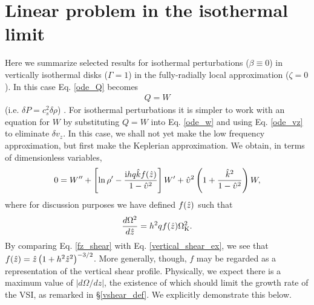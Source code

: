 \section{Linear problem in the isothermal limit}\label{iso_discuss}  
Here we summarize selected results for isothermal
perturbations ($\beta\equiv 0$) in vertically isothermal disks 
($\Gamma=1$) in the fully-radially local approximation
($\zeta=0$). In this case Eq. \ref{ode_Q}
becomes    
\begin{align} 
  Q = W 
\end{align}
(i.e. $\delta P = c_s^2\delta \rho$)%
. For isothermal perturbations it is 
simpler to work with an equation for $W$ by substituting $Q=W$ into
Eq. \ref{ode_w} and using Eq. \ref{ode_vz} to eliminate $\delta v_z$. 
In this case, we shall not yet make the low frequency
approximation, but first make the  Keplerian approximation. We
obtain, in terms of dimensionless variables, 
\begin{align}
  0 = W^{\prime\prime} + \left[\ln\rho^\prime - \frac{\mathrm{i} h q \hat{k} f(\hat{z})
      }{1-\hat{\upsilon}^2} \right]W^\prime +
  \hat{\upsilon}^2\left(1+\frac{\hat{k}^2}{1-\hat{\upsilon}^2}\right)W,\label{iso_ode0} 
\end{align}
where for discussion purposes we have defined $f(\hat{z})$ such that
\begin{align}\label{fz_shear}
  \frac{d\Omega^2}{d\hat{z}} = h^2q f(\hat{z})\Omega_{\rm K}^2.
\end{align}
By comparing Eq. \ref{fz_shear} with Eq. \ref{vertical_shear_ex}, we
see that $f(\hat{z})= 
\hat{z}\left(1+h^2\hat{z}^2\right)^{-3/2}$. More generally, though,
$f$ may be regarded as a representation of the vertical
shear profile. Physically, we expect there is a maximum value of 
$|d\Omega/dz|$, the existence of which should limit the growth rate of
the VSI,  as remarked in \S\ref{vshear_def}. We explicitly demonstrate
this below.     

